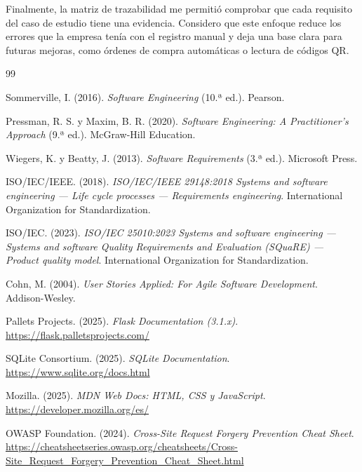 \documentclass[12pt,letterpaper]{article}
\begin{document}
Finalmente, la matriz de trazabilidad me permitió comprobar que cada requisito del caso de estudio tiene una evidencia. Considero que este enfoque reduce los errores que la empresa tenía con el registro manual y deja una base clara para futuras mejoras, como órdenes de compra automáticas o lectura de códigos QR.

\begin{thebibliography}{99}

Sommerville, I. (2016). \textit{Software Engineering} (10.ª ed.). Pearson.

Pressman, R. S. y Maxim, B. R. (2020). \textit{Software Engineering: A Practitioner's Approach} (9.ª ed.). McGraw-Hill Education.

Wiegers, K. y Beatty, J. (2013). \textit{Software Requirements} (3.ª ed.). Microsoft Press.

ISO/IEC/IEEE. (2018). \textit{ISO/IEC/IEEE 29148:2018 Systems and software engineering — Life cycle processes — Requirements engineering}. International Organization for Standardization.

ISO/IEC. (2023). \textit{ISO/IEC 25010:2023 Systems and software engineering — Systems and software Quality Requirements and Evaluation (SQuaRE) — Product quality model}. International Organization for Standardization.

Cohn, M. (2004). \textit{User Stories Applied: For Agile Software Development}. Addison-Wesley.

Pallets Projects. (2025). \textit{Flask Documentation (3.1.x)}. \url{https://flask.palletsprojects.com/}

SQLite Consortium. (2025). \textit{SQLite Documentation}. \url{https://www.sqlite.org/docs.html}

Mozilla. (2025). \textit{MDN Web Docs: HTML, CSS y JavaScript}. \url{https://developer.mozilla.org/es/}

OWASP Foundation. (2024). \textit{Cross-Site Request Forgery Prevention Cheat Sheet}. \url{https://cheatsheetseries.owasp.org/cheatsheets/Cross-Site_Request_Forgery_Prevention_Cheat_Sheet.html}

\end{thebibliography}
\end{document}
